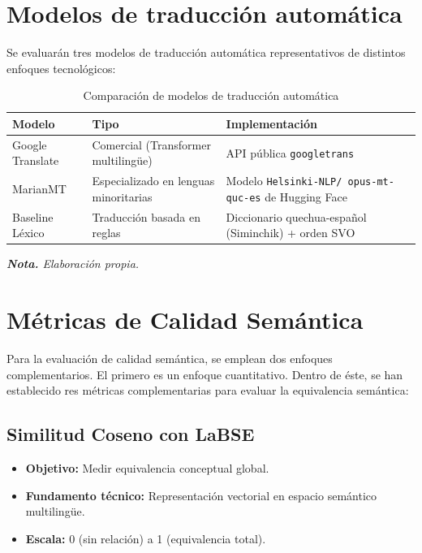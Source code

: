     \section{Modelos de traducción automática}
    
    Se evaluarán tres modelos de traducción automática representativos de distintos enfoques tecnológicos:

    \begin{table}[h!]
        \centering
        \caption{Comparación de modelos de traducción automática}
        \begin{tabularx}{\textwidth}{|X|X|X|}
        \hline
        \textbf{Modelo} & \textbf{Tipo} & \textbf{Implementación} \\
        \hline
        Google Translate & Comercial (Transformer multilingüe) & API pública \texttt{googletrans} \\
        \hline
        MarianMT & Especializado en lenguas minoritarias & Modelo \texttt{Helsinki-NLP/ opus-mt-quc-es} de Hugging Face \\
        \hline
        Baseline Léxico & Traducción basada en reglas & Diccionario quechua-español (Siminchik) + orden SVO \\
        \hline
        \end{tabularx}
        \label{tab:modelos_traduccion_tipo}
        \vspace{0.5cm}
        \textit{\textbf{Nota.} Elaboración propia.}
    \end{table}
    
        
    \section{Métricas de Calidad Semántica}
    
    Para la evaluación de calidad semántica, se emplean dos enfoques complementarios. El primero es un enfoque cuantitativo. Dentro de éste, se han establecido res métricas complementarias para evaluar la equivalencia semántica:

    \subsection{Similitud Coseno con LaBSE}
        \begin{itemize}
            \item \textbf{Objetivo:} Medir equivalencia conceptual global.
            \item \textbf{Fundamento técnico:} Representación vectorial en espacio semántico multilingüe.
            \item \textbf{Escala:} 0 (sin relación) a 1 (equivalencia total).
        \end{itemize}


